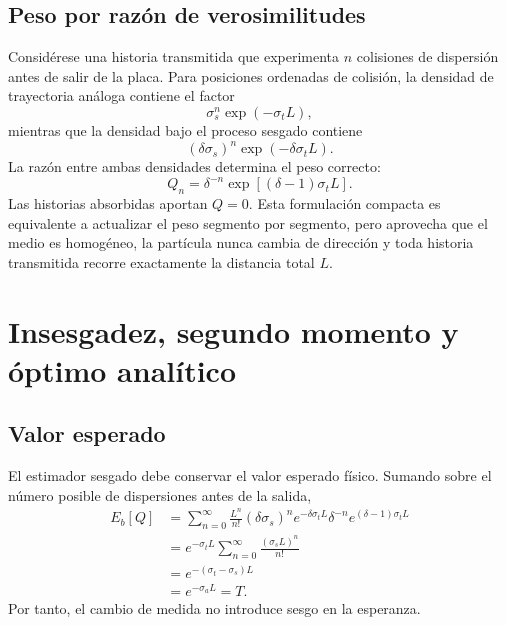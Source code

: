 \documentclass[11pt]{article}
\begin{document}
\subsection{Peso por razón de verosimilitudes}
Considérese una historia transmitida que experimenta $n$ colisiones de dispersión antes de salir de la placa. Para posiciones ordenadas de colisión, la densidad de trayectoria análoga contiene el factor
\begin{equation}
    \sigma_s^n\exp(-\sigma_t L),
\end{equation}
mientras que la densidad bajo el proceso sesgado contiene
\begin{equation}
    (\delta\sigma_s)^n\exp(-\delta\sigma_t L).
\end{equation}
La razón entre ambas densidades determina el peso correcto:
\begin{equation}
    \boxed{
    Q_n=\delta^{-n}\exp\left[(\delta-1)\sigma_t L\right]
    }.
    \label{eq:weight}
\end{equation}
Las historias absorbidas aportan $Q=0$. Esta formulación compacta es equivalente a actualizar el peso segmento por segmento, pero aprovecha que el medio es homogéneo, la partícula nunca cambia de dirección y toda historia transmitida recorre exactamente la distancia total $L$.

\section{Insesgadez, segundo momento y óptimo analítico}
\subsection{Valor esperado}
El estimador sesgado debe conservar el valor esperado físico. Sumando sobre el número posible de dispersiones antes de la salida,
\begin{align}
E_b[Q]
&=\sum_{n=0}^{\infty}
\frac{L^n}{n!}
(\delta\sigma_s)^n e^{-\delta\sigma_tL}
\delta^{-n}e^{(\delta-1)\sigma_tL}\\
&=e^{-\sigma_tL}\sum_{n=0}^{\infty}\frac{(\sigma_sL)^n}{n!}\\
&=e^{-(\sigma_t-\sigma_s)L}\\
&=e^{-\sigma_aL}=T.
\end{align}
Por tanto, el cambio de medida no introduce sesgo en la esperanza.
\end{document}
